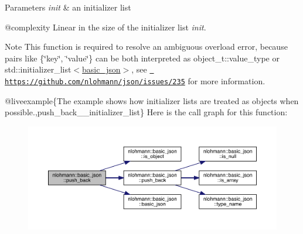 \begin{DoxyParams}{Parameters}
{\em init} & an initializer list\\
\hline
\end{DoxyParams}
@complexity Linear in the size of the initializer list {\itshape init}.

\begin{DoxyNote}{Note}
This function is required to resolve an ambiguous overload error, because pairs like {\ttfamily \{\char`\"{}key\char`\"{}, \char`\"{}value\char`\"{}\}} can be both interpreted as {\ttfamily object\+\_\+t\+::value\+\_\+type} or {\ttfamily std\+::initializer\+\_\+list$<$\mbox{\hyperlink{classnlohmann_1_1basic__json}{basic\+\_\+json}}$>$}, see \href{https://github.com/nlohmann/json/issues/235}{\texttt{ https\+://github.\+com/nlohmann/json/issues/235}} for more information.
\end{DoxyNote}
@liveexample\{The example shows how initializer lists are treated as objects when possible.,push\+\_\+back\+\_\+\+\_\+initializer\+\_\+list\} Here is the call graph for this function\+:\nopagebreak
\begin{figure}[H]
\begin{center}
\leavevmode
\includegraphics[width=350pt]{classnlohmann_1_1basic__json_ab2716cbe2e997ab8309926b87f044434_cgraph}
\end{center}
\end{figure}
\mbox{\label{classnlohmann_1_1basic__json_a1ef93e2006dbe52667294f5ef38b0b10}} 
